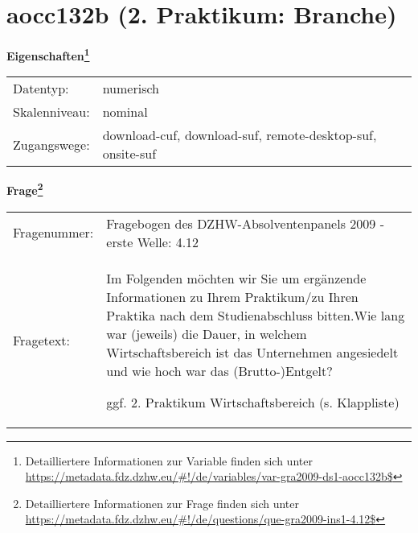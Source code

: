 
    \setcounter{footnote}{0}

    \vspace*{-1.8cm}
	\section{aocc132b (2. Praktikum: Branche)}
	\label{section:aocc132b}



    \vspace*{0.5cm}
    \noindent\textbf{Eigenschaften\footnote{Detailliertere Informationen zur Variable finden sich unter
		\url{https://metadata.fdz.dzhw.eu/\#!/de/variables/var-gra2009-ds1-aocc132b$}}}\\
	\begin{tabularx}{\hsize}{@{}lX}
	Datentyp: & numerisch \\
	Skalenniveau: & nominal \\
	Zugangswege: &
	  download-cuf, 
	  download-suf, 
	  remote-desktop-suf, 
	  onsite-suf
 \\
    \end{tabularx}



				\vspace*{0.5cm}
                \noindent\textbf{Frage\footnote{Detailliertere Informationen zur Frage finden sich unter
		              \url{https://metadata.fdz.dzhw.eu/\#!/de/questions/que-gra2009-ins1-4.12$}}}\\
				\begin{tabularx}{\hsize}{@{}lX}
					Fragenummer: &
					  Fragebogen des DZHW-Absolventenpanels 2009 - erste Welle:
					  4.12
 \\
					Fragetext: & Im Folgenden möchten wir Sie um ergänzende Informationen zu Ihrem Praktikum/zu Ihren Praktika nach dem Studienabschluss bitten.Wie lang war (jeweils) die Dauer, in welchem Wirtschaftsbereich ist das Unternehmen angesiedelt und wie hoch war das (Brutto-)Entgelt?\par  ggf. 2. Praktikum Wirtschaftsbereich (s. Klappliste) \\
				\end{tabularx}





